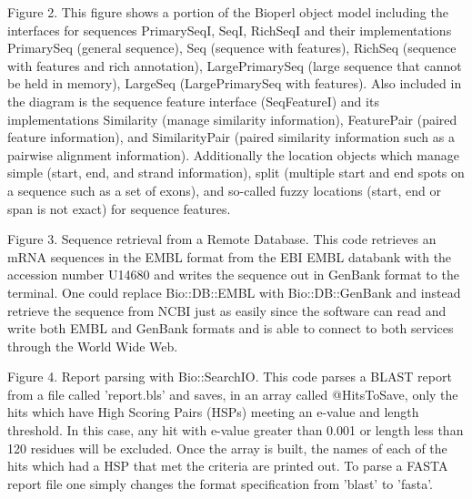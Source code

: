 \documentclass[12pt]{article}
\begin{document}
\newpage


Figure 2. This figure shows a portion of the Bioperl object model
including the interfaces for sequences PrimarySeqI, SeqI, RichSeqI and
their implementations PrimarySeq (general sequence), Seq (sequence
with features), RichSeq (sequence with features and rich
annotation), LargePrimarySeq (large sequence that cannot be held in memory),
LargeSeq (LargePrimarySeq with features).  Also included in the
diagram is the sequence feature interface (SeqFeatureI) and its
implementations Similarity (manage similarity information),
FeaturePair (paired feature information), and SimilarityPair (paired
similarity information such as a pairwise alignment information).
Additionally the location objects which manage simple (start, end, and
strand information), split (multiple start and end spots on a sequence
such as a set of exons), and so-called fuzzy locations (start, end or span
is not exact) for sequence features.

\newpage


Figure 3. Sequence retrieval from a Remote Database.  This code
retrieves an mRNA sequences in the EMBL format from the EBI EMBL
databank with the accession number U14680 and writes the sequence out
in GenBank format to the terminal.  One could replace Bio::DB::EMBL
with Bio::DB::GenBank and instead retrieve the sequence from NCBI just
as easily since the software can read and write both EMBL and GenBank
formats and is able to connect to both services through the World Wide
Web.

\newpage


Figure 4. Report parsing with Bio::SearchIO.  This code parses a BLAST
report from a file called 'report.bls' and saves, in an array called
@HitsToSave, only the hits which have High Scoring Pairs (HSPs)
meeting an e-value and length threshold.  In this case, any hit with
e-value greater than 0.001 or length less than 120 residues will be
excluded.  Once the array is built, the names of each of the hits
which had a HSP that met the criteria are printed out.  To parse a
FASTA \cite{fasta} report file one simply changes the format
specification from 'blast' to 'fasta'.

\newpage

\singlespacing

\newpage
\end{document}
